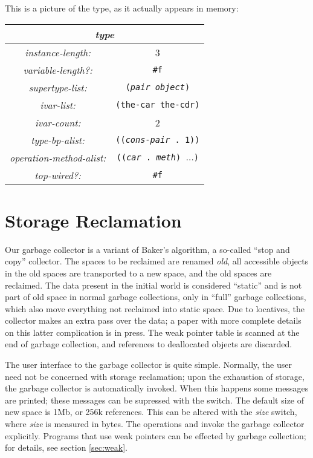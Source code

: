 This is a picture of the  type, as it actually appears
in memory:

\begin{center}
\begin{tabular}{|c|c|} \hline
 \multicolumn{2}{|c|}{\em type} \\\hline
 {\em instance-length:} & 3 \\\hline
 {\em variable-length?:} & {\tt \#f} \\\hline
 {\em supertype-list:} & {\tt ({\em pair} {\em object})}\\\hline
 {\em ivar-list:} & {\tt (the-car the-cdr)} \\\hline
 {\em ivar-count:} & 2 \\\hline
 {\em type-bp-alist:} & {\tt (({\em cons-pair} . 1))} \\\hline
 {\em operation-method-alist:} & {\tt (({\em car} . {\em meth}) $\ldots$)}\\\hline
 {\em top-wired?:} & {\tt \#f} \\\hline
\end{tabular}
\end{center}

\section{Storage Reclamation}

Our garbage collector \cite{PEARLMUTTER99} is a variant of Baker's
algorithm, a so-called ``stop and copy'' collector.  The spaces to be
reclaimed are renamed {\em old}, all accessible objects in the old
spaces are transported to a new space, and the old spaces are
reclaimed.  The data present in the initial world is considered
``static'' and is not part of old space in normal garbage collections,
only in ``full'' garbage collections, which also move everything not
reclaimed into static space.  Due to locatives, the collector makes an
extra pass over the data; a paper with more complete details on this
latter complication is in press.  The weak pointer table is scanned at
the end of garbage collection, and references to deallocated objects
are discarded.

The user interface to the garbage collector is quite simple.
Normally, the user need not be concerned with storage reclamation;
upon the exhaustion of storage, the garbage collector is automatically
invoked.  When this happens some messages are printed; these messages
can be supressed with the  switch.  The default size of new
space is 1Mb, or 256k references.  This can be altered with the
 {\em size} switch, where {\em size} is measured in bytes.  The
operations  and  invoke the garbage collector
explicitly.  Programs that use weak pointers can be effected by
garbage collection; for details, see section \ref{sec:weak}.


